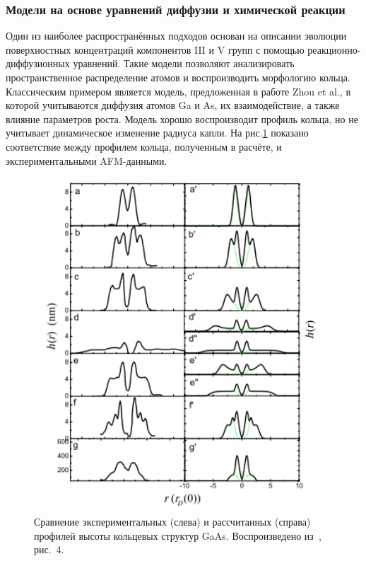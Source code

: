 \documentclass[14pt,oneside]{extarticle}
\begin{document}
\subsubsection*{Модели на основе уравнений диффузии и химической реакции}
Один из наиболее распространённых подходов основан на описании эволюции поверхностных концентраций компонентов III и V групп с помощью реакционно-диффузионных уравнений. Такие модели позволяют анализировать пространственное распределение атомов и воспроизводить морфологию кольца. Классическим примером является модель, предложенная в работе Zhou et al.\cite{zhou2013}, в которой учитываются диффузия атомов Ga и As, их взаимодействие, а также влияние параметров роста. Модель хорошо воспроизводит профиль кольца, но не учитывает динамическое изменение радиуса капли. На рис.\ref{fig:zhou_profiles} показано соответствие между профилем кольца, полученным в расчёте, и экспериментальными AFM-данными.

\begin{figure}
    \begin{center}
        \includegraphics[width=11cm]{images/zhou_profiles.png}
        \caption{\label{fig:zhou_profiles}
            Сравнение экспериментальных (слева) и рассчитанных (справа) профилей высоты кольцевых структур GaAs. Воспроизведено из~\cite{zhou2013}, рис.~4.}
    \end{center}
\end{figure}
\end{document}
